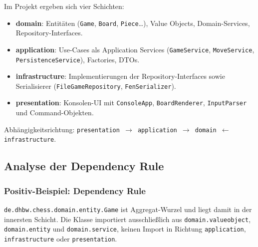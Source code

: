\documentclass[a4paper,12pt]{article}
\begin{document}
Im Projekt ergeben sich vier Schichten:

\begin{itemize}
    \item \textbf{domain}: Entitäten (\texttt{Game}, \texttt{Board}, \texttt{Piece}…), Value
          Objects, Domain-Services, Repository-Interfaces.
    \item \textbf{application}: Use-Cases als Application Services (\texttt{GameService},
          \texttt{MoveService}, \texttt{PersistenceService}), Factories, DTOs.
    \item \textbf{infrastructure}: Implementierungen der Repository-Interfaces sowie
          Serialisierer (\texttt{FileGameRepository}, \texttt{FenSerializer}).
    \item \textbf{presentation}: Konsolen-UI mit \texttt{ConsoleApp}, \texttt{BoardRenderer},
          \texttt{InputParser} und Command-Objekten.
\end{itemize}

Abhängigkeitsrichtung: \texttt{presentation $\to$ application $\to$ domain $\leftarrow$ infrastructure}.

\subsection*{Analyse der Dependency Rule}

\subsubsection*{Positiv-Beispiel: Dependency Rule}

\texttt{de.dhbw.chess.domain.entity.Game} ist Aggregat-Wurzel und liegt damit in der innersten
Schicht. Die Klasse importiert ausschließlich aus \texttt{domain.valueobject}, \texttt{domain.entity}
und \texttt{domain.service}, keinen Import in Richtung \texttt{application},
\texttt{infrastructure} oder \texttt{presentation}.

\end{document}
